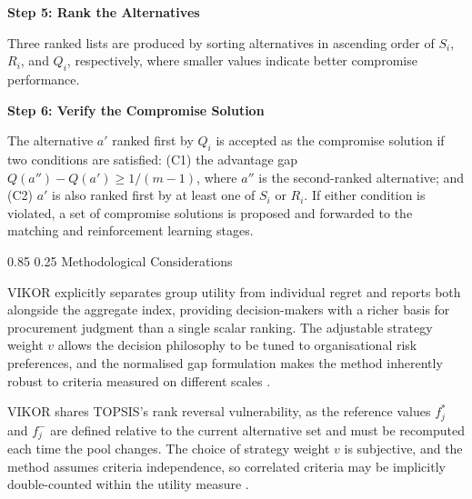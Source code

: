 \documentclass[11pt]{article}
\makeatletter
\renewcommand\paragraph{\@startsection{paragraph}{4}{\z@}%
  {0.85\baselineskip}%
  {0.25\baselineskip}%
  {\normalfont\normalsize\bfseries}}
\newcommand{\stepheading}[1]{%
\par\vspace{0.75\baselineskip}%
\noindent\textbf{#1}\par
\vspace{0.25\baselineskip}%
}
\makeatother
\begin{document}
\stepheading{Step 5: Rank the Alternatives}

Three ranked lists are produced by sorting alternatives in ascending order of $S_i$, $R_i$, and $Q_i$, respectively, where smaller values indicate better compromise performance.

\stepheading{Step 6: Verify the Compromise Solution}

The alternative $a'$ ranked first by $Q_i$ is accepted as the compromise solution if two conditions are satisfied: (C1) the advantage gap $Q(a'')-Q(a')\geq1/(m-1)$, where $a''$ is the second-ranked alternative; and (C2) $a'$ is also ranked first by at least one of $S_i$ or $R_i$. If either condition is violated, a set of compromise solutions is proposed and forwarded to the matching and reinforcement learning stages.

\paragraph{Methodological Considerations}

\begin{description}[leftmargin=1.8em, labelsep=0.6em, style=nextline]
\item[Strengths:] VIKOR explicitly separates group utility from individual regret and reports both alongside the aggregate index, providing decision-makers with a richer basis for procurement judgment than a single scalar ranking. The adjustable strategy weight $v$ allows the decision philosophy to be tuned to organisational risk preferences, and the normalised gap formulation makes the method inherently robust to criteria measured on different scales \cite{ref75,ref83}.
\item[Limitations:] VIKOR shares TOPSIS's rank reversal vulnerability, as the reference values $f_j^*$ and $f_j^-$ are defined relative to the current alternative set and must be recomputed each time the pool changes. The choice of strategy weight $v$ is subjective, and the method assumes criteria independence, so correlated criteria may be implicitly double-counted within the utility measure \cite{ref82,ref83}.
\end{description}
\end{document}
